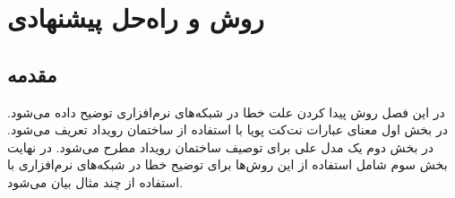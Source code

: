 \chapter{روش و راه‌حل پیشنهادی}
\section{مقدمه}
در این فصل روش پیدا کردن علت خطا در شبکه‌های نرم‌افزاری توضیح داده می‌شود.
در بخش اول معنای عبارات نت‌کت پویا با استفاده از ساختمان رویداد تعریف می‌شود.
در بخش دوم یک مدل علی برای توصیف ساختمان رویداد مطرح می‌شود.
در نهایت بخش سوم شامل استفاده از این روش‌ها برای توضیح خطا در شبکه‌های نرم‌افزاری با استفاده از چند مثال بیان می‌شود.







